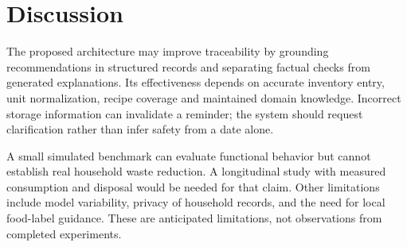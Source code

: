 \section{Discussion}
The proposed architecture may improve traceability by grounding recommendations in structured records and separating factual checks from generated explanations. Its effectiveness depends on accurate inventory entry, unit normalization, recipe coverage and maintained domain knowledge. Incorrect storage information can invalidate a reminder; the system should request clarification rather than infer safety from a date alone.

A small simulated benchmark can evaluate functional behavior but cannot establish real household waste reduction. A longitudinal study with measured consumption and disposal would be needed for that claim. Other limitations include model variability, privacy of household records, and the need for local food-label guidance. These are anticipated limitations, not observations from completed experiments.
